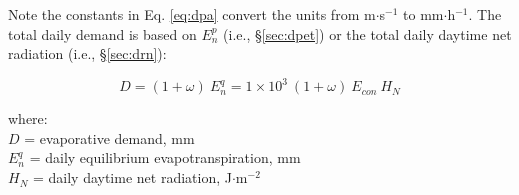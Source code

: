 \noindent Note the constants in Eq. \ref{eq:dpa} convert the units from m$\cdot$s$^{-1}$ to mm$\cdot$h$^{-1}$. 
The total daily demand is based on $E^p_n$ (i.e., \S \ref{sec:dpet}) or the total daily daytime net radiation (i.e., \S \ref{sec:drn}):

\begin{equation}
\label{eq:daydp}
	D = \left(1 + \omega \right)\: E^q_n 
	  = 1\times 10^3\:\left(1 + \omega \right)\: E_{con}\: H_N
\end{equation}

\noindent where:\\
\indent $D$ = evaporative demand, mm\\
\indent $E^q_n$ = daily equilibrium evapotranspiration, mm\\
\indent $H_N$ = daily daytime net radiation, J$\cdot$m$^{-2}$ \\

